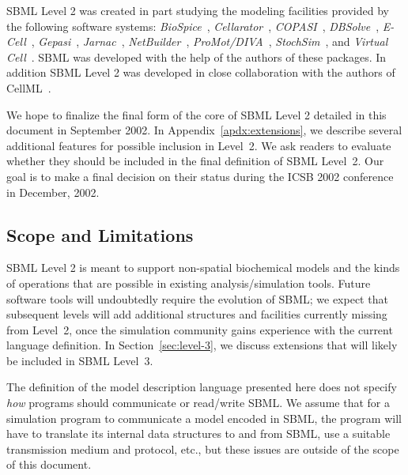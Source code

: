 \documentclass[10pt,twocolumntoc]{cekarticle}
\begin{document}
SBML Level 2 was created in part studying the modeling facilities provided
by the following software systems: \emph{BioSpice}~\citep{arkin:2001},
\emph{Cellarator}~\citep{shapiro:2000}, \emph{COPASI}~\citep{mendes:2000},
\emph{DBSolve}~\citep{goryanin:2001,goryanin:1999},
\emph{E-Cell}~\citep{tomita:1999,tomita:2001},
\emph{Gepasi}~\citep{mendes:1997,mendes:2001},
\emph{Jarnac}~\citep{sauro:2000,sauro:1991},
\emph{NetBuilder}~\citep{schilstra:2002},
\emph{ProMot/DIVA}~\citep{stelling:2001},
\emph{StochSim}~\citep{bray:2001,morton-firth:1998}, and \emph{Virtual
  Cell}~\citep{schaff:2000,schaff:2001}. SBML was developed with the help
of the authors of these packages.  In addition SBML Level 2 was developed
in close collaboration with the authors of CellML~\citep{hedley:2001b}.

We hope to finalize the final form of the core of SBML Level 2 detailed in
this document in September 2002.  In Appendix~\ref{apdx:extensions}, we
describe several additional features for possible inclusion in Level~2.
We ask readers to evaluate whether they should be included in the final
definition of SBML Level~2.  Our goal is to make a final decision on
their status during the ICSB 2002 conference in December, 2002.


\subsection{Scope and Limitations}

SBML Level 2 is meant to support non-spatial biochemical models
and the kinds of operations that are possible in existing
analysis/simulation tools.  Future software tools will undoubtedly require the
evolution of SBML; we expect that subsequent levels will add
additional structures and facilities currently missing from
Level~2, once the simulation community gains experience with the
current language definition. In Section~\ref{sec:level-3}, we
discuss extensions that will likely be included in SBML Level~3.

The definition of the model description language presented here does not
specify \emph{how} programs should communicate or read/write SBML.  We
assume that for a simulation program to communicate a model encoded in
SBML, the program will have to translate its internal data structures to
and from SBML, use a suitable transmission medium and protocol, etc., but
these issues are outside of the scope of this document.
\end{document}
